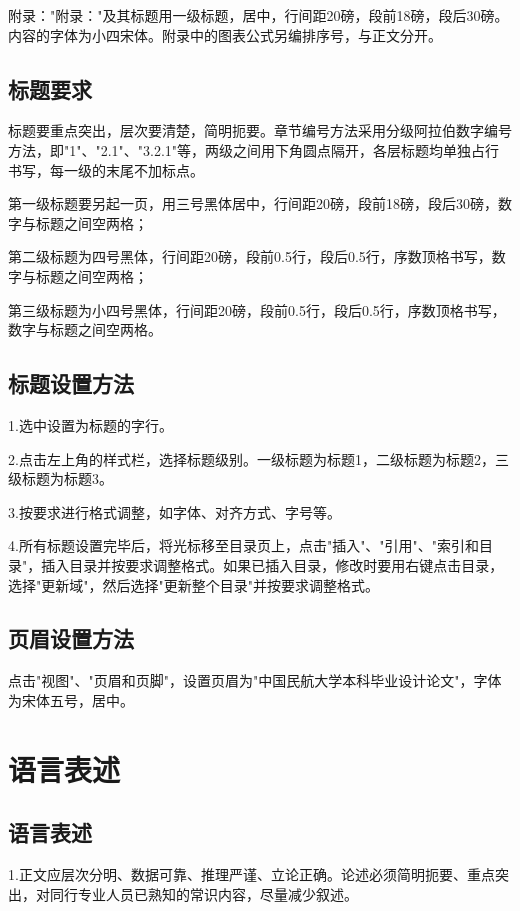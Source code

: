 \documentclass[
	StudentName     = 姓名,
	StudentID       = 学号,
	AdvisorName     = 指导教师,
	Grade           = 年级,
	Major           = 专业,
	Department      = 一个很长很长的名字,
	SubmitYear		= 2022,
	SubmitMonth		= 5,
	Title           = 论文中文题目,
	TitleEng        = {{English Title}}
]{cauc_thesis}
\begin{document}
	附录："附录："及其标题用一级标题，居中，行间距20磅，段前18磅，段后30磅。内容的字体为小四宋体。附录中的图表公式另编排序号，与正文分开。
	
	\subsection{标题要求}
	
	标题要重点突出，层次要清楚，简明扼要。章节编号方法采用分级阿拉伯数字编号方法，即"1"、"2.1"、"3.2.1"等，两级之间用下角圆点隔开，各层标题均单独占行书写，每一级的末尾不加标点。
	
	第一级标题要另起一页，用三号黑体居中，行间距20磅，段前18磅，段后30磅，数字与标题之间空两格；
	
	第二级标题为四号黑体，行间距20磅，段前0.5行，段后0.5行，序数顶格书写，数字与标题之间空两格；
	
	第三级标题为小四号黑体，行间距20磅，段前0.5行，段后0.5行，序数顶格书写，数字与标题之间空两格。
	
	\subsection{标题设置方法}
	
	1.选中设置为标题的字行。
	
	2.点击左上角的样式栏，选择标题级别。一级标题为标题1，二级标题为标题2，三级标题为标题3。
	
	3.按要求进行格式调整，如字体、对齐方式、字号等。
	
	4.所有标题设置完毕后，将光标移至目录页上，点击"插入"、"引用"、"索引和目录"，插入目录并按要求调整格式。如果已插入目录，修改时要用右键点击目录，选择"更新域"，然后选择"更新整个目录"并按要求调整格式。
	
	\subsection{页眉设置方法}
	
	点击"视图"、"页眉和页脚"，设置页眉为"中国民航大学本科毕业设计论文"，字体为宋体五号，居中。
	
	\section{语言表述}
	
	\subsection{语言表述}
	1.正文应层次分明、数据可靠、推理严谨、立论正确。论述必须简明扼要、重点突出，对同行专业人员已熟知的常识内容，尽量减少叙述。
	
\end{document}
